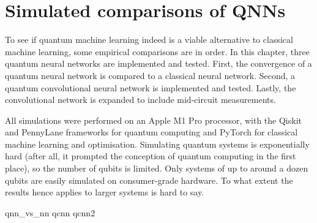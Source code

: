 \chapter{Simulated comparisons of QNNs}
\label{chap:comparison}

To see if quantum machine learning indeed is a viable alternative to classical machine learning, some empirical comparisons are in order.
In this chapter, three quantum neural networks are implemented and tested.
First, the convergence of a quantum neural network is compared to a classical neural network.
Second, a quantum convolutional neural network is implemented and tested.
Lastly, the convolutional network is expanded to include mid-circuit measurements.

All simulations were performed on an Apple M1 Pro processor, with the Qiskit \cite{qiskit} and PennyLane \cite{pennylane} frameworks for quantum computing and PyTorch \cite{pytorch} for classical machine learning and optimisation.
Simulating quantum systems is exponentially hard (after all, it prompted the conception of quantum computing in the first place), so the number of qubits is limited.
Only systems of up to around a dozen qubits are easily simulated on consumer-grade hardware.
To what extent the results hence applies to larger systems is hard to say.

{qnn_vs_nn}
{qcnn}
{qcnn2}